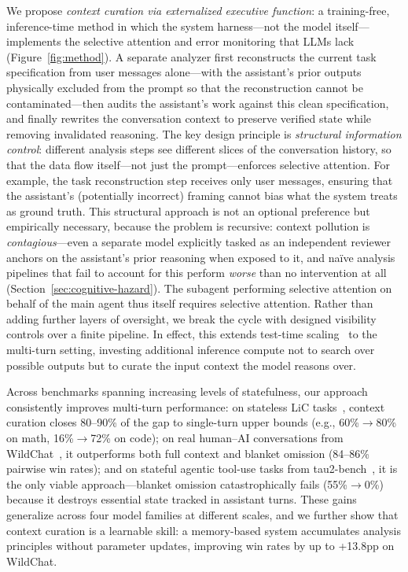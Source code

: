 \documentclass{article} %
\begin{document}
We propose \emph{context curation via externalized executive function}: a training-free, inference-time method in which the system harness---not the model itself---implements the selective attention and error monitoring that LLMs lack (Figure~\ref{fig:method}). A separate analyzer first reconstructs the current task specification from user messages alone---with the assistant's prior outputs physically excluded from the prompt so that the reconstruction cannot be contaminated---then audits the assistant's work against this clean specification, and finally rewrites the conversation context to preserve verified state while removing invalidated reasoning. The key design principle is \emph{structural information control}: different analysis steps see different slices of the conversation history, so that the data flow itself---not just the prompt---enforces selective attention. For example, the task reconstruction step receives only user messages, ensuring that the assistant's (potentially incorrect) framing cannot bias what the system treats as ground truth. This structural approach is not an optional preference but empirically necessary, because the problem is recursive: context pollution is \emph{contagious}---even a separate model explicitly tasked as an independent reviewer anchors on the assistant's prior reasoning when exposed to it, and na\"ive analysis pipelines that fail to account for this perform \emph{worse} than no intervention at all (Section~\ref{sec:cognitive-hazard}). The subagent performing selective attention on behalf of the main agent thus itself requires selective attention. Rather than adding further layers of oversight, we break the cycle with designed visibility controls over a finite pipeline. In effect, this extends test-time scaling~\citep{wei2022chain,wang2023selfconsistency,yao2024tree,snell2024scalettc} to the multi-turn setting, investing additional inference compute not to search over possible outputs but to curate the input context the model reasons over.

Across benchmarks spanning increasing levels of statefulness, our approach consistently improves multi-turn performance: on stateless LiC tasks~\citep{laban2025lost}, context curation closes 80--90\% of the gap to single-turn upper bounds (e.g., 60\%$\to$80\% on math, 16\%$\to$72\% on code); on real human--AI conversations from WildChat~\citep{zhao2024wildchat}, it outperforms both full context and blanket omission (84--86\% pairwise win rates); and on stateful agentic tool-use tasks from tau2-bench~\citep{barres2025tau2}, it is the only viable approach---blanket omission catastrophically fails (55\%$\to$0\%) because it destroys essential state tracked in assistant turns. These gains generalize across four model families at different scales, and we further show that context curation is a learnable skill: a memory-based system accumulates analysis principles without parameter updates, improving win rates by up to +13.8pp on WildChat.
\end{document}

